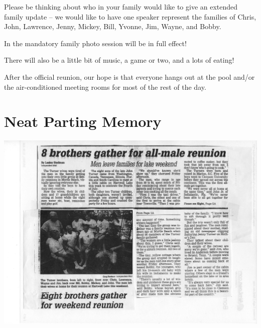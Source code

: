 \documentclass[
]{book}
\begin{document}
Please be thinking about who in your family would like to give an extended family update -- we would like to have one speaker represent the families of Chris, John, Lawrence, Jenny, Mickey, Bill, Yvonne, Jim, Wayne, and Bobby.

In the mandatory family photo session will be in full effect!

There will also be a little bit of music, a game or two, and a lots of eating!

After the official reunion, our hope is that everyone hangs out at the pool and/or the air-conditioned meeting rooms for most of the rest of the day.

\hypertarget{neat-parting-memory}{%
\section*{Neat Parting Memory}\label{neat-parting-memory}}

\includegraphics[width=0.77\linewidth]{images/brothers}
\end{document}
